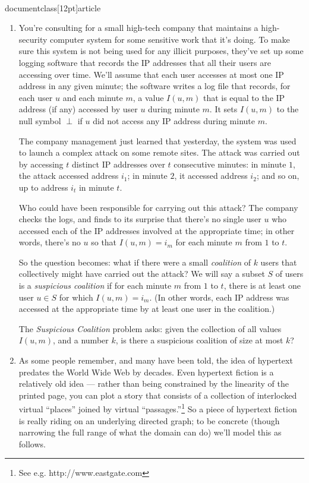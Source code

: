 \\documentclass[12pt]{article}
\begin{document}
\begin{enumerate}
\item 

You're consulting for a small high-tech company that
maintains a high-security computer system for some
sensitive work that it's doing.
To make sure this system is not being used
for any illicit purposes, they've set up some logging
software that records the IP addresses that all their
users are accessing over time.
We'll assume that each user accesses at most one
IP address in any given minute;
the software writes a log file that records,
for each user $u$ and each minute $m$,
a value $I(u,m)$ that is equal to the IP address (if any)
accessed by user $u$ during minute $m$.
It sets $I(u,m)$ to the null symbol $\perp$
if $u$ did not access any IP address during minute $m$.

The company management just learned that yesterday, the system was used
to launch a complex attack on some remote sites.
The attack was carried out by accessing $t$ distinct
IP addresses over $t$ consecutive minutes:
in minute $1$, the attack accessed address $i_1$;
in minute $2$, it accessed address $i_2$;
and so on, up to address $i_t$ in minute $t$.

Who could have been responsible for carrying out this attack?
The company checks the logs, and finds to its surprise that
there's no single user $u$ who accessed each of the
IP addresses involved at the appropriate time;
in other words, there's no $u$ so that $I(u,m) = i_m$
for each minute $m$ from $1$ to $t$.

So the question becomes: what if there were a small
{\em coalition} of $k$ users that collectively might
have carried out the attack?
We will say a subset $S$ of users is a {\em suspicious coalition}
if for each minute $m$ from $1$ to $t$,
there is at least one user $u \in S$ for which $I(u,m) = i_m$.
(In other words, each IP address was accessed at the appropriate
time by at least one user in the coalition.)

The {\em Suspicious Coalition} problem asks:
given the collection of all values $I(u,m)$,
and a number $k$,
is there a suspicious coalition of size at most $k$?




\item 

As some people remember, and many have been told,
the idea of hypertext predates the World Wide Web
by decades.
Even hypertext fiction is a relatively old idea ---
rather than being constrained by the linearity of the printed page,
you can plot a story that consists of a collection
of interlocked virtual ``places''
joined by virtual ``passages.''\footnote{See
e.g. http://www.eastgate.com}
So a piece of hypertext fiction is really riding on
an underlying directed graph; to be concrete
(though narrowing the full range of what the domain can do)
we'll model this as follows.


\end{enumerate}
\end{document}
